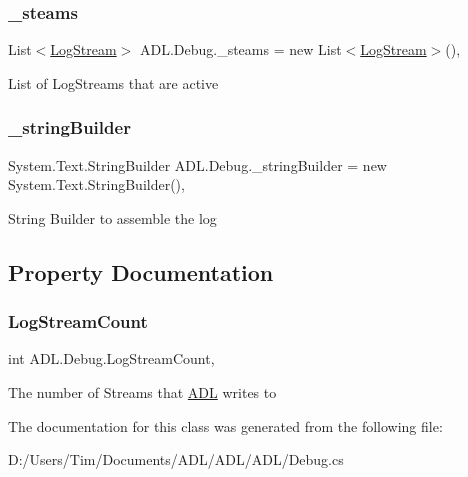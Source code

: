 \subsubsection{\texorpdfstring{\+\_\+steams}{\_steams}}
{\footnotesize\ttfamily List$<$\mbox{\hyperlink{class_a_d_l_1_1_log_stream}{Log\+Stream}}$>$ A\+D\+L.\+Debug.\+\_\+steams = new List$<$\mbox{\hyperlink{class_a_d_l_1_1_log_stream}{Log\+Stream}}$>$()\hspace{0.3cm}{\ttfamily [static]}, {\ttfamily [private]}}



List of Log\+Streams that are active 

\mbox{\label{class_a_d_l_1_1_debug_a8f063e98d96cd91379b5f63969124877}} 
\subsubsection{\texorpdfstring{\+\_\+string\+Builder}{\_stringBuilder}}
{\footnotesize\ttfamily System.\+Text.\+String\+Builder A\+D\+L.\+Debug.\+\_\+string\+Builder = new System.\+Text.\+String\+Builder()\hspace{0.3cm}{\ttfamily [static]}, {\ttfamily [private]}}



String Builder to assemble the log 



\subsection{Property Documentation}
\mbox{\label{class_a_d_l_1_1_debug_a5a63093ff8ac05237224edcce57396c4}} 
\subsubsection{\texorpdfstring{Log\+Stream\+Count}{LogStreamCount}}
{\footnotesize\ttfamily int A\+D\+L.\+Debug.\+Log\+Stream\+Count\hspace{0.3cm}{\ttfamily [static]}, {\ttfamily [get]}}



The number of Streams that \mbox{\hyperlink{namespace_a_d_l}{A\+DL}} writes to 



The documentation for this class was generated from the following file\+:\begin{DoxyCompactItemize}
\item 
D\+:/\+Users/\+Tim/\+Documents/\+A\+D\+L/\+A\+D\+L/\+A\+D\+L/Debug.\+cs\end{DoxyCompactItemize}
